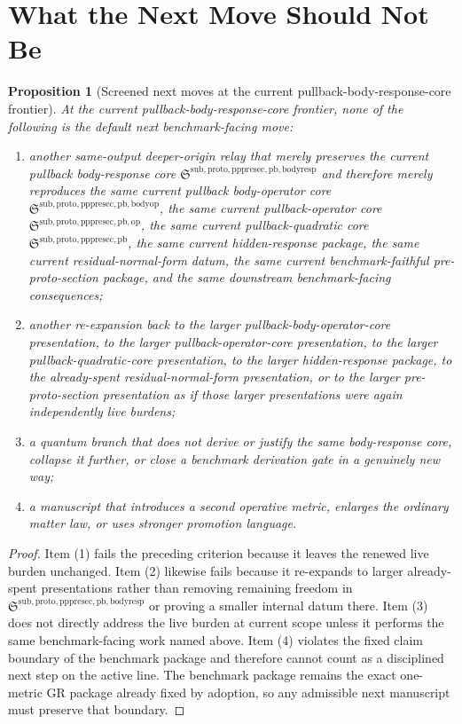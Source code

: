 \documentclass[11pt]{article}
\newcommand{\PrePreProtoSectionPullbackCore}{\mathfrak S^{\mathrm{sub,proto,pppresec,pb}}}
\newcommand{\PullbackOperatorCore}{\mathfrak S^{\mathrm{sub,proto,pppresec,pb,op}}}
\newcommand{\PullbackBodyOperatorCore}{\mathfrak S^{\mathrm{sub,proto,pppresec,pb,bodyop}}}
\newcommand{\PullbackBodyResponseCore}{\mathfrak S^{\mathrm{sub,proto,pppresec,pb,bodyresp}}}
\newtheorem{proposition}{Proposition}
\begin{document}
\section{What the Next Move Should Not Be}

\begin{proposition}[Screened next moves at the current pullback-body-response-core frontier]
At the current pullback-body-response-core frontier, none of the following is the default next benchmark-facing move:
\begin{enumerate}
    \item another same-output deeper-origin relay that merely preserves the current pullback body-response core \(\PullbackBodyResponseCore\) and therefore merely reproduces the same current pullback body-operator core \(\PullbackBodyOperatorCore\), the same current pullback-operator core \(\PullbackOperatorCore\), the same current pullback-quadratic core \(\PrePreProtoSectionPullbackCore\), the same current hidden-response package, the same current residual-normal-form datum, the same current benchmark-faithful pre-proto-section package, and the same downstream benchmark-facing consequences;
    \item another re-expansion back to the larger pullback-body-operator-core presentation, to the larger pullback-operator-core presentation, to the larger pullback-quadratic-core presentation, to the larger hidden-response package, to the already-spent residual-normal-form presentation, or to the larger pre-proto-section presentation as if those larger presentations were again independently live burdens;
    \item a quantum branch that does not derive or justify the same body-response core, collapse it further, or close a benchmark derivation gate in a genuinely new way;
    \item a manuscript that introduces a second operative metric, enlarges the ordinary matter law, or uses stronger promotion language.
\end{enumerate}
\end{proposition}

\begin{proof}
Item (1) fails the preceding criterion because it leaves the renewed live burden unchanged. Item (2) likewise fails because it re-expands to larger already-spent presentations rather than removing remaining freedom in \(\PullbackBodyResponseCore\) or proving a smaller internal datum there. Item (3) does not directly address the live burden at current scope unless it performs the same benchmark-facing work named above. Item (4) violates the fixed claim boundary of the benchmark package and therefore cannot count as a disciplined next step on the active line. The benchmark package remains the exact one-metric GR package already fixed by adoption, so any admissible next manuscript must preserve that boundary.
\end{proof}
\end{document}
